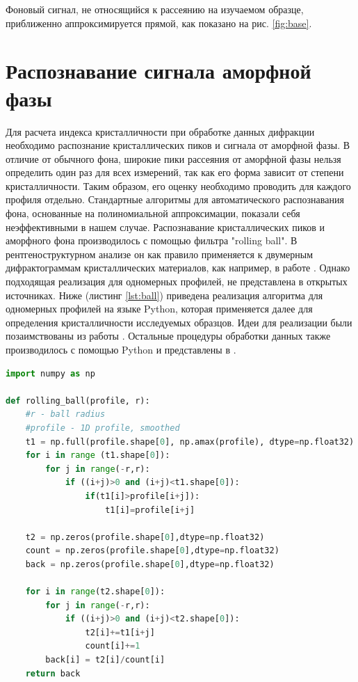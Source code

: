 Фоновый сигнал, не относящийся к рассеянию на изучаемом образце, приближенно аппроксимируется прямой, как показано на рис. \ref{fig:base}.



\section{Распознавание сигнала аморфной фазы}

	
	Для расчета индекса кристалличности при обработке данных дифракции необходимо распознание кристаллических пиков и сигнала от аморфной фазы.
	В отличие от обычного фона, широкие пики рассеяния от аморфной фазы нельзя определить один раз для всех измерений, так как его форма зависит от степени кристалличности. Таким образом, его оценку необходимо проводить для каждого профиля отдельно.
	Стандартные алгоритмы для автоматического распознавания фона, основанные на полиномиальной аппроксимации, показали себя неэффективными в нашем случае. Распознавание кристаллических пиков и аморфного фона производилось с помощью фильтра "rolling ball". В рентгеноструктурном анализе он как правило применяется к двумерным дифрактограммам кристаллических материалов, как например, в работе \cite{ball2018}. Однако подходящая реализация для одномерных профилей, не представлена в открытых источниках. Ниже (листинг \ref{lst:ball}) приведена реализация алгоритма для одномерных профилей на языке Python, которая применяется далее для определения кристалличности исследуемых образцов. Идеи для реализации были позаимствованы из работы \cite{ball-code}. Остальные процедуры обработки данных также производилось с помощью Python и представлены в \cite{git}.
	 
\vspace{5px}
	\begin{lstlisting}[language=Python, caption= Реализация распознавание кристаллических пиков по алгоритму "rolling ball", label={lst:ball}]
import numpy as np

def rolling_ball(profile, r):
    #r - ball radius
    #profile - 1D profile, smoothed
    t1 = np.full(profile.shape[0], np.amax(profile), dtype=np.float32)
    for i in range (t1.shape[0]):
        for j in range(-r,r):
            if ((i+j)>0 and (i+j)<t1.shape[0]):
                if(t1[i]>profile[i+j]):
                    t1[i]=profile[i+j]
                    
    t2 = np.zeros(profile.shape[0],dtype=np.float32)
    count = np.zeros(profile.shape[0],dtype=np.float32)
    back = np.zeros(profile.shape[0],dtype=np.float32) 
    
    for i in range(t2.shape[0]): 
        for j in range(-r,r):
            if ((i+j)>0 and (i+j)<t2.shape[0]):
                t2[i]+=t1[i+j]
                count[i]+=1
        back[i] = t2[i]/count[i]
    return back
 

\end{lstlisting}
\vspace{5px}

